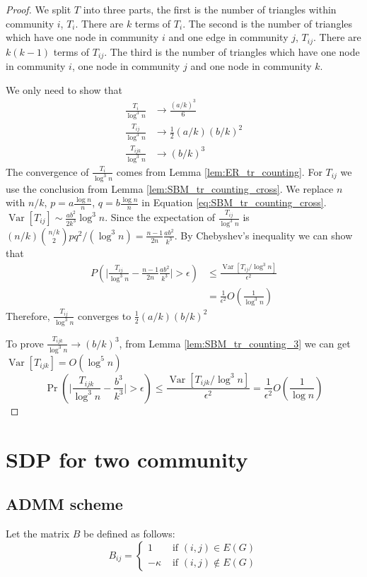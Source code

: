 \documentclass{ctexart}
\DeclareMathOperator{\Var}{Var}
\begin{document}
\begin{proof}
	We split $T$ into three parts, the first is the number of triangles within community $i$, $T_i$. There are $k$ terms of $T_i$.
	The second is the number of triangles which have one node in community $i$ and one edge in community $j$, $T_{ij}$. There are $k(k-1)$ terms of $T_{ij}$. The third is the number of triangles which have one node in community $i$, one node in community $j$ and one node in community $k$.
	
	We only need to show that
	\begin{align}
	\frac{T_i}{\log ^3 n} &\to \frac{(a/k)^3}{6} \\
	\frac{T_{ij}}{\log^3 n}& \to \frac{1}{2}(a/k)(b/k)^2\\
	\frac{T_{ijk}}{\log^3 n} & \to (b/k)^3
	\end{align}
	The convergence of $\frac{T_i}{\log ^3 n}$ comes from Lemma \ref{lem:ER_tr_counting}.
	For $T_{ij}$ we use the conclusion from Lemma \ref{lem:SBM_tr_counting_cross}.
	We replace $n$ with $n/k$, $p=a\frac{\log n}{n}$, $q=b\frac{\log n}{n}$ in Equation \eqref{eq:SBM_tr_counting_cross}.
$\Var[T_{ij}] \sim \frac{ab^2}{2k^3} \log^3 n$. Since the expectation of $\frac{T_{ij}}{\log^3 n}$ is $(n/k)\binom{n/k}{2}pq^2/(\log^3 n)
=\frac{n-1}{2n}\frac{ab^2}{k^3}$. By Chebyshev's inequality we can show that 
\begin{align*}
P( \Big|\frac{T_{ij}}{\log^3 n} - \frac{n-1}{2n}\frac{ab^2}{k^3} \Big| > \epsilon) &\leq \frac{\Var[T_{ij} / \log^3 n]}{\epsilon^2} \\
& = \frac{1}{\epsilon^2}
O(\frac{1}{\log^3 n})
\end{align*}
	Therefore, $\frac{T_{ij}}{\log^3 n} $ converges to $\frac{1}{2}(a/k)(b/k)^2$
	
	To prove $\frac{T_{ijk}}{\log^3 n}\to (b/k)^3$, from Lemma \ref{lem:SBM_tr_counting_3} we can get $\Var[T_{ijk}] = O(\log^5 n)$
$$
\Pr( \Big|\frac{T_{ijk}}{\log^3 n} -\frac{b^3}{k^3} \Big| > \epsilon) \leq \frac{\Var[T_{ijk} / \log^3 n]}{\epsilon^2} = \frac{1}{\epsilon^2}
O(\frac{1}{\log n})
$$
\end{proof}
\section{SDP for two community}
\subsection{ADMM scheme}
Let the matrix $B$ be defined as follows:
\begin{equation}\label{eq:B_matrix}
	B_{ij} = \begin{cases} 1 & \textrm{ if } (i,j) \in E(G) \\
		-\kappa & \textrm{ if } (i,j) \not \in E(G)
	\end{cases}
\end{equation}
\end{document}
